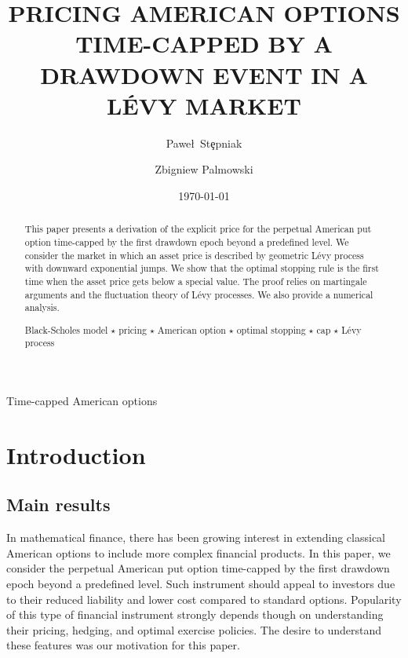 \documentclass[10pt]{amsart}
\title{PRICING AMERICAN OPTIONS TIME-CAPPED BY A DRAWDOWN EVENT IN A L\'EVY MARKET}
\author{Pawe\l\ St\c{e}pniak}
\author{Zbigniew Palmowski}
\date{\today}
\begin{document}
	\begin{abstract}
		This paper presents a derivation of the explicit price for the perpetual American put option time-capped by the first drawdown epoch beyond a predefined level.
		We consider the market in which an asset price is described by geometric L\'evy process with downward exponential jumps.
		We show that the optimal stopping rule is the first time when the asset price gets below a special value.
		The proof relies on martingale arguments and the fluctuation theory of L\'evy processes. We also provide a numerical analysis.
		\vspace{3mm}
		
		Black-Scholes model  $\star$ pricing $\star$ American option $\star$ optimal stopping $\star$ cap $\star$ L\'evy process
		
		
	\end{abstract}
	
	\maketitle
	
	
	\pagestyle{myheadings}  {\sc Time-capped American options}
	
	
	\vspace{1.8cm}
	
	\tableofcontents
	
	\newpage
	
	\section{Introduction}
	\subsection{Main results}
	
	
	In mathematical finance, there has been growing interest in extending classical American options to include more complex financial products.
	In this paper, we consider the perpetual American put option time-capped by the first drawdown epoch beyond a predefined level.
	Such instrument should appeal to investors due to their reduced liability and lower cost compared to standard options. Popularity of this type of financial instrument strongly depends though on
	understanding their pricing, hedging, and optimal exercise policies. The desire to understand these features was our motivation for this paper.
	
\end{document}
